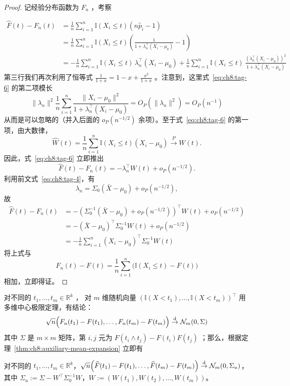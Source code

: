 \begin{proof}

记经验分布函数为 $F_n$ ，考察

\begin{equation}
\label{eq:ch8:tag-6}
\begin{aligned} \widehat{F}(t)-F_n(t) &= \frac1n\sum_{i=1}^n \mathbb I(X_i\le t)(n\widehat{p}_i-1)\\ &= \frac1n\sum_{i=1}^n \mathbb I(X_i\le t)\left(\frac1{1+\lambda_n^\top(X_i-\mu_0)}-1\right)\\ &= -\frac1n\sum_{i=1}^n \mathbb I(X_i\le t)\,\lambda_n^\top (X_i-\mu_0) + \frac1n\sum_{i=1}^n\mathbb I(X_i\le t)\,\frac{(\lambda_n^\top (X_i-\mu_0))^2}{1+\lambda_n^\top (X_i-\mu_0)} \end{aligned}
\end{equation}
第三行我们再次利用了恒等式 $\textstyle\frac1{1+x}=1-x+\frac{x^2}{1+x}$ 。注意到，这里式~\eqref{eq:ch8:tag-6} 的第二项模长 
$$\|\lambda_n\|^2 \frac1n\sum_{i=1}^n \frac{\|X_i-\mu_0\|^2}{1+\lambda_n^\top (X_i-\mu_0)} = O_P(\|\lambda_n\|^2) = O_P(n^{-1})$$
从而是可以忽略的（并入后面的 $o_P(n^{-1/2})$ 余项）。至于式~\eqref{eq:ch8:tag-6} 的第一项，由大数律，
\[
\widehat W(t)=\frac1n\sum_{i=1}^n\mathbb I(X_i\le t)(X_i-\mu_0)
\overset P\longrightarrow W(t).
\]
因此，式~\eqref{eq:ch8:tag-6} 立即推出
\[
\widehat F(t)-F_n(t)=-\lambda_n^\top W(t)+o_P(n^{-1/2}).
\]
利用前文式~\eqref{eq:ch8:tag-4}，有
\[
\lambda_n=\Sigma_0(\bar X-\mu_0)+o_P(n^{-1/2}),
\]
故
\[\begin{aligned} \widehat{F}(t)-F_n(t) &= -(\Sigma_0^{-1}(\bar X-\mu_0) + o_P(n^{-1/2}))^\top W(t) + o_P(n^{-1/2})\\ &= -(\bar X-\mu_0)^\top \Sigma_0^{-1} W(t) + o_P(n^{-1/2})\\ &=-\frac1n\sum_{i=1}^n(X_i-\mu_0)^\top\Sigma_0^{-1}W(t) \end{aligned}\]
将上式与 \[ F_n(t)-F(t) = \frac1n\sum_{i=1}^n \bigl(\mathbb I(X_i\le t) - F(t) \bigr) \]相加，立即得证。

\end{proof}

对不同的 $t_1,\dots,t_m\in\mathbb R^k$ ， 对 $m$ 维随机向量 $(\mathbb I(X< t_1),\dots,\mathbb I(X< t_m))^\top$ 用多维中心极限定理，有结论： \[ \sqrt n\Big(F_n(t_1)-F(t_1),\dots, F_n(t_m)-F(t_m)\Big)\overset{\rm d}\to \mathcal N_m(0,\Sigma) \]其中 $\Sigma$ 是 $m\times m$ 矩阵，第 $i,j$ 元为 $F(t_i\wedge t_j)-F(t_i)F(t_j)$ ；那么，根据定理~\ref{thm:ch8:auxiliary-mean-expansion} 立即有

\begin{corollary*}
对不同的 $t_1,\dots,t_m\in\mathbb R^k$，$\sqrt n\Big(\widehat F(t_1)-F(t_1),\dots,\widehat F(t_m)-F(t_m)\Big)\overset{\rm d}\to \mathcal N_m(0,\Sigma_u)$，其中 $\Sigma_u:=\Sigma-W^\top\Sigma_0^{-1} W$，$W:=(W(t_1),W(t_2),\dots,W(t_m))$。
\end{corollary*}

